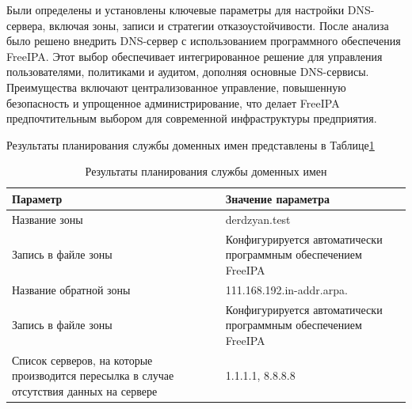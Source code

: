 Были определены и установлены ключевые параметры для настройки DNS-сервера, включая зоны, записи и стратегии отказоустойчивости. После анализа было решено внедрить DNS-сервер с использованием программного обеспечения FreeIPA. Этот выбор обеспечивает интегрированное решение для управления пользователями, политиками и аудитом, дополняя основные DNS-сервисы. Преимущества включают централизованное управление, повышенную безопасность и упрощенное администрирование, что делает FreeIPA предпочтительным выбором для современной инфраструктуры предприятия. 

Результаты планирования службы доменных имен представлены в Таблице\;\ref{table:dns}

\begin{table}[H]
\centering
{}
\caption{Результаты планирования службы доменных имен\;\label{table:dns}}
\small
\begin{tabularx}{\textwidth}{|X|X|}
\hline
Параметр & Значение параметра \\
\hline
Название зоны & derdzyan.test \\
\hline
Запись в файле зоны & Конфигурируется автоматически программным обеспечением FreeIPA \\
\hline
Название обратной зоны & 111.168.192.in-addr.arpa. \\
\hline
Запись в файле зоны & Конфигурируется автоматически программным обеспечением FreeIPA \\
\hline
Список серверов, на которые производится пересылка в случае отсутствия данных на сервере & 1.1.1.1, 8.8.8.8 \\
\hline
\end{tabularx}
\end{table}


